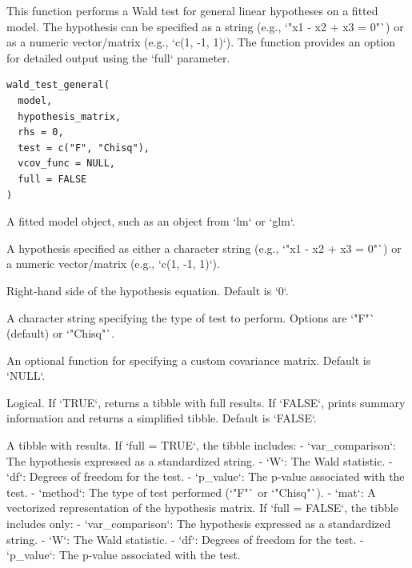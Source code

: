 \documentclass[a4paper]{book}
\begin{document}
%
\begin{Description}
This function performs a Wald test for general linear hypotheses on a fitted model.
The hypothesis can be specified as a string (e.g., `"x1 - x2 + x3 = 0"`) or as
a numeric vector/matrix (e.g., `c(1, -1, 1)`). The function provides an option
for detailed output using the `full` parameter.
\end{Description}
%
\begin{Usage}
\begin{verbatim}
wald_test_general(
  model,
  hypothesis_matrix,
  rhs = 0,
  test = c("F", "Chisq"),
  vcov_func = NULL,
  full = FALSE
)
\end{verbatim}
\end{Usage}
%
\begin{Arguments}
\begin{ldescription}
\item[\code{model}] A fitted model object, such as an object from `lm` or `glm`.

\item[\code{hypothesis\_matrix}] A hypothesis specified as either a character string (e.g., `"x1 - x2 + x3 = 0"`)
or a numeric vector/matrix (e.g., `c(1, -1, 1)`).

\item[\code{rhs}] Right-hand side of the hypothesis equation. Default is `0`.

\item[\code{test}] A character string specifying the type of test to perform. Options are `"F"` (default) or `"Chisq"`.

\item[\code{vcov\_func}] An optional function for specifying a custom covariance matrix. Default is `NULL`.

\item[\code{full}] Logical. If `TRUE`, returns a tibble with full results. If `FALSE`, prints summary information
and returns a simplified tibble. Default is `FALSE`.
\end{ldescription}
\end{Arguments}
%
\begin{Value}
A tibble with results. If `full = TRUE`, the tibble includes:
- `var\_comparison`: The hypothesis expressed as a standardized string.
- `W`: The Wald statistic.
- `df`: Degrees of freedom for the test.
- `p\_value`: The p-value associated with the test.
- `method`: The type of test performed (`"F"` or `"Chisq"`).
- `mat`: A vectorized representation of the hypothesis matrix.
If `full = FALSE`, the tibble includes only:
- `var\_comparison`: The hypothesis expressed as a standardized string.
- `W`: The Wald statistic.
- `df`: Degrees of freedom for the test.
- `p\_value`: The p-value associated with the test.
\end{Value}
\end{document}
